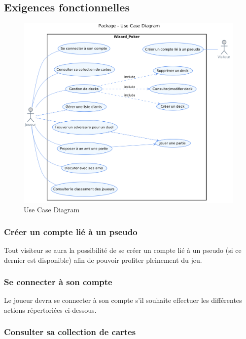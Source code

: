 \documentclass[11pt,a4paper]{article}
\begin{document}
\subsection{Exigences fonctionnelles}
\label{sec:exi-fonc}
\begin{figure}[ht]
  \centering
  \includegraphics[width=1\textwidth]{../uml_files/UseCaseDiagram.png}
  \caption{\label{fig:usecasebesoin} Use Case Diagram}
\end{figure}

\subsubsection*{Créer un compte lié à un pseudo}

Tout visiteur se aura la possibilité de se créer un compte
lié à un pseudo (si ce dernier est disponible) afin de pouvoir
profiter pleinement du jeu.


\subsubsection*{Se connecter à son compte}

Le joueur devra se connecter à son compte s'il souhaite effectuer
les différentes actions répertoriées ci-dessous.


\subsubsection*{Consulter sa collection de cartes}
\end{document}
